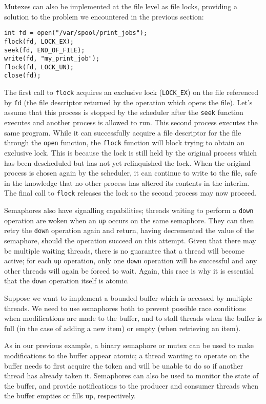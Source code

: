 Mutexes can also be implemented at the file level as file locks,
providing a solution to the problem we encountered in the previous
section:

\begin{verbatim}
int fd = open("/var/spool/print_jobs");
flock(fd, LOCK_EX);
seek(fd, END_OF_FILE);
write(fd, "my_print_job");
flock(fd, LOCK_UN);
close(fd);
\end{verbatim}

The first call to \texttt{flock} acquires an exclusive lock
(\texttt{LOCK\_EX}) on the file referenced by \texttt{fd} (the file
descriptor returned by the operation which opens the file).  Let's
assume that this process is stopped by the scheduler after the
\texttt{seek} function executes and another process is allowed to run.
This second process executes the same program.  While it can
successfully acquire a file descriptor for the file through the
\texttt{open} function, the \texttt{flock} function will block trying
to obtain an exclusive lock.  This is because the lock is still held
by the original process which has been descheduled but has not yet
relinquished the lock.  When the original process is chosen again by
the scheduler, it can continue to write to the file, safe in the
knowledge that no other process has altered its contents in the
interim.  The final call to \texttt{flock} releases the lock so the
second process may now proceed.

Semaphores also have signalling capabilities; threads waiting to
perform a \texttt{down} operation are woken when an \texttt{up} occurs
on the same semaphore.  They can then retry the \texttt{down}
operation again and return, having decremented the value of the
semaphore, should the operation succeed on this attempt.  Given that
there may be multiple waiting threads, there is no guarantee that a
thread will become active; for each \texttt{up} operation, only one
\texttt{down} operation will be successful and any other threads will
again be forced to wait.  Again, this race is why it is essential that
the \texttt{down} operation itself is atomic.

Suppose we want to implement a bounded buffer which is accessed by
multiple threads.  We need to use semaphores both to prevent possible
race conditions when modifications are made to the buffer, and to
stall threads when the buffer is full (in the case of adding a new
item) or empty (when retrieving an item).

As in our previous example, a binary semaphore or mutex can be used to
make modifications to the buffer appear atomic; a thread wanting to
operate on the buffer needs to first acquire the token and will be
unable to do so if another thread has already taken it.  Semaphores
can also be used to monitor the state of the buffer, and provide
notifications to the producer and consumer threads when the buffer
empties or fills up, respectively.

